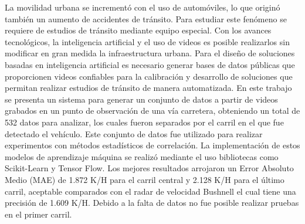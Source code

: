 

\begin{spacing}{1.5}

La movilidad urbana se incrementó con el uso de automóviles, lo que originó también un aumento de accidentes de tránsito. Para estudiar este fenómeno se requiere de estudios de tránsito mediante equipo especial. Con los avances tecnológicos, la inteligencia artificial y el uso de videos es posible realizarlos sin modificar en gran medida la infraestructura urbana. Para el diseño de soluciones basadas en inteligencia artificial es necesario generar bases de datos públicas que proporcionen videos confiables para la calibración y desarrollo de soluciones que permitan realizar estudios de tránsito de manera automatizada. En este trabajo se presenta un sistema para generar un conjunto de datos a partir de videos grabados en un punto de observación de una vía carretera, obteniendo un total de 532 datos para analizar, los cuales fueron separados por el carril en el que fue detectado el vehículo. Este conjunto de datos fue utilizado para realizar experimentos con métodos estadísticos de correlación. La implementación de estos modelos de aprendizaje máquina se realizó mediante el uso bibliotecas como Scikit-Learn y Tensor Flow. Los mejores resultados arrojaron un Error Absoluto Medio (MAE) de 1.872 K/H para el carril central y 2.128 K/H para el último carril, aceptable comparados con el radar de velocidad Bushnell el cual tiene una precisión de 1.609 K/H. Debido a la falta de datos no fue posible realizar pruebas en el primer carril.  




\end{spacing}